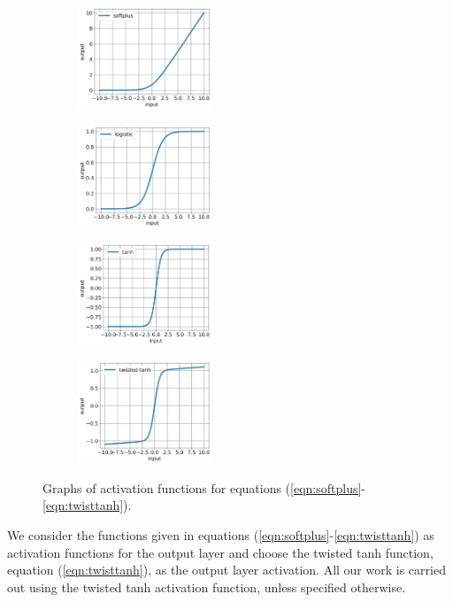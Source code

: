 \documentclass[12pt]{article}
\newcommand{\nhghalfwidth}{0.48\linewidth}
\begin{document}
\begin{figure}[!h]
  \centering
  \begin{subfigure}[t]{\nhghalfwidth}
    \centering
    \includegraphics[width=4cm]{Figures/scripts/softplus.png}
  \end{subfigure}
  \begin{subfigure}[t]{\nhghalfwidth}
    \centering
    \includegraphics[width=4cm]{Figures/scripts/logistic.png}
  \end{subfigure}
  \begin{subfigure}[t]{\nhghalfwidth}
    \centering   
    \includegraphics[width=4cm]{Figures/scripts/tanh.png}
  \end{subfigure}
  \begin{subfigure}[t]{\nhghalfwidth}
    \centering
    \includegraphics[width=4cm]{Figures/scripts/twistedtanh.png}
  \end{subfigure}
\caption{\label{fig:activations} Graphs of activation functions for equations (\ref{eqn:softplus}-\ref{eqn:twisttanh}).}
\end{figure}
%
We consider the functions given in equations (\ref{eqn:softplus}-\ref{eqn:twisttanh}) as activation functions for the output layer and choose the twisted tanh function, equation (\ref{eqn:twisttanh}), as the output layer activation. All our work is carried out using the twisted tanh activation function, unless specified otherwise.
\end{document}
